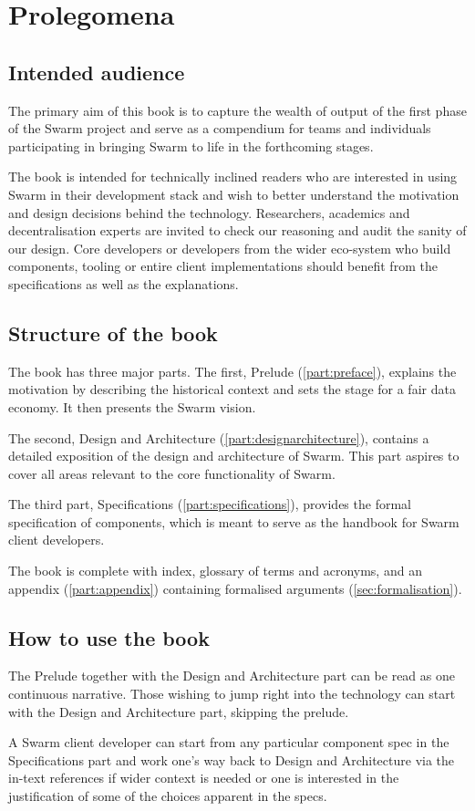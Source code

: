 \chapter{Prolegomena \statusgreen}
\green{}
\section*{Intended audience \statusgreen}
The primary aim of this book is to capture the wealth of output of the first phase of the Swarm project and serve as a compendium for teams and individuals participating in bringing Swarm to life in the forthcoming stages.

The book is intended for technically inclined readers who are interested in using Swarm in their development stack and wish to better understand the motivation and design decisions behind the technology. Researchers, academics and decentralisation experts are invited to check our reasoning and audit the sanity of our design. Core developers or developers from the wider eco-system who build components, tooling or entire client implementations should benefit from the specifications as well as the explanations.

\section*{Structure of the book \statusgreen}

The book has three major parts. The first, Prelude (\ref{part:preface}), explains the motivation by describing the historical context and sets the stage for a fair data economy. It then presents the Swarm vision.

The second, Design and Architecture (\ref{part:designarchitecture}), contains a detailed exposition of the design and architecture of Swarm. This part aspires to cover all areas relevant to the core functionality of Swarm.

The third part, Specifications (\ref{part:specifications}), provides the formal specification of components, which is meant to serve as the handbook for Swarm client developers.

The book is complete with index, glossary of terms and acronyms, and an appendix (\ref{part:appendix}) containing formalised arguments (\ref{sec:formalisation}).

\section*{How to use the book \statusgreen}

The Prelude together with the Design and Architecture part can be read as one continuous narrative. Those wishing to jump right into the technology can start with the Design and Architecture part, skipping the prelude.

A Swarm client developer can start from any particular component spec in the Specifications part and work one's way back to Design and Architecture via the in-text references if wider context is needed or one is interested in the justification of some of the choices apparent in the specs.

